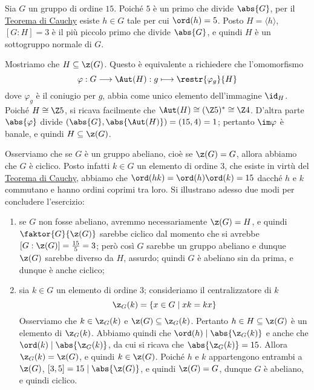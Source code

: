 \documentclass[11pt]{scrartcl}
\begin{document}
	\begin{soln}
		Sia $G$ un gruppo di ordine $15$. Poiché $5$ è un primo che divide $\abs{G}$,
		per il \hyperref[teorema1.44]{Teorema di Cauchy} esiste $h \in G$ tale per cui $\ord(h) = 5$. Posto $H = \langle h\rangle$, $[G:H] = 3$ è il più piccolo primo che divide $\abs{G}$, e quindi $H$ è un sottogruppo 
		normale di $G$. \medskip
		
		
		Mostriamo che $H \subseteq \z(G)$. Questo è equivalente a 
		richiedere che l'omomorfismo \[
		\varphi: G \longrightarrow \Aut(H) : g \longmapsto \restr{\varphi_{g}}{H}
		\]
		dove $\varphi_g$ è il coniugio per $g$, abbia come unico elemento dell'immagine
		$\id_H$.
		Poiché $H \cong \Z5$, si ricava facilmente che $\Aut(H) \cong (\Z5)^* \cong \Z4$. D'altra 
		parte $\abs{\varphi}$ divide $(\abs{G}, \abs{\Aut(H)}) = (15, 4) = 1$; pertanto
		$\im \varphi$ è banale, e quindi $H \subseteq \z(G)$. \medskip
		
		
		Osserviamo che se $G$ è un gruppo abeliano, cioè se $\z(G) = G$,
		allora abbiamo che $G$ è ciclico. Posto infatti $k \in G$ un elemento di 
		ordine $3$, che esiste in virtù del \hyperref[teorema1.44]{Teorema di Cauchy},
		abbiamo che $\ord(hk) = \ord(h)\ord(k) = 15$ dacché $h$ e $k$ commutano e hanno
		ordini coprimi tra loro.
		Si illustrano adesso due modi per concludere l'esercizio:
		\begin{enumerate}[(1)]
			\item se $G$ non fosse abeliano, avremmo 
			necessariamente $\z(G) = H$, e quindi $\faktor{G}{\z(G)}$ sarebbe ciclico 
			dal momento che si avrebbe $[G : \z(G)] = \frac{15}{5} = 3$; però così $G$ sarebbe un gruppo abeliano e dunque $\z(G)$ sarebbe diverso da $H$, assurdo; quindi $G$
			è abeliano sin da prima, e dunque è anche ciclico;
			\item sia $k \in G$ un elemento di ordine 3; consideriamo il centralizzatore
			di $k$
			\[
			\z_G(k) = \{x \in G\mid xk = kx\}
			\]Osserviamo che $k \in \z_G(k)$ e $\z(G) \subseteq \z_G(k)$. Pertanto $h \in H \subseteq \z(G)$ è un elemento 
			di $\z_G(k)$. Abbiamo quindi che $\ord(h)\mid \abs{\z_G(k)}$ e anche che $\ord(k)\mid \abs{\z_G(k)}$, 
			da cui si ricava che $\abs{\z_G(k)} = 15$. Allora $\z_G(k) = \z(G)$, e quindi
			$k \in \z(G)$. Poiché $h$ e $k$ appartengono entrambi a $\z(G)$,
			$[3, 5] = 15 \mid \abs{\z(G)}$, e quindi $\z(G) = G$, dunque
			$G$ è abeliano, e quindi ciclico.
		\end{enumerate}
	\end{soln}
	
\end{document}
